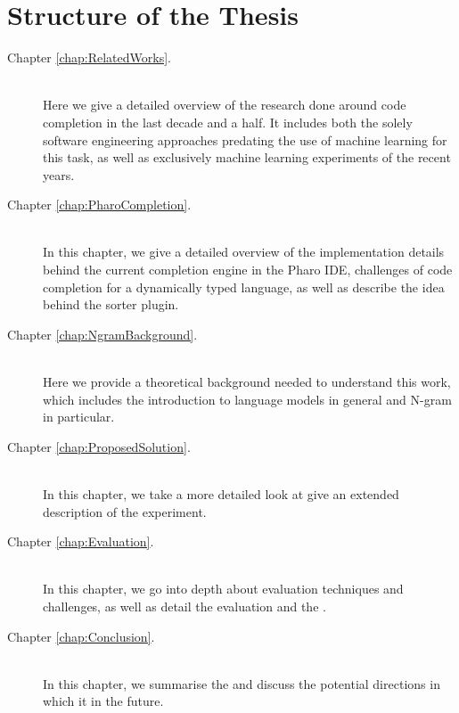 \section{Structure of the Thesis}
\label{sec:Introduction-Structure}
{\hypersetup{linkcolor=black}
\begin{description}
	\item [Chapter \ref{chap:RelatedWorks}. ] \hfill \\
	Here we give a detailed overview of the research done around code completion in the last decade and a half. It includes both the solely software engineering approaches predating the use of machine learning for this task, as well as exclusively machine learning experiments of the recent years.
    \item [Chapter \ref{chap:PharoCompletion}. ] \hfill \\
	In this chapter, we give a detailed overview of the implementation details behind the current completion engine in the Pharo IDE, challenges of code completion for a dynamically typed language, as well as describe the idea behind the sorter plugin.
	\item [Chapter \ref{chap:NgramBackground}. ] \hfill \\
    Here we provide a theoretical background needed to understand this work, which includes the introduction to  language models in general and N-gram  in particular.
    \item [Chapter \ref{chap:ProposedSolution}. ] \hfill \\
	In this chapter, we take a more detailed look at  give an extended description of the experiment.
	\item [Chapter \ref{chap:Evaluation}. ] \hfill \\
    In this chapter, we go into depth about evaluation techniques and challenges, as well as detail the evaluation   and the .
    \item [Chapter \ref{chap:Conclusion}. ] \hfill \\
	In this chapter, we summarise the  and discuss the potential directions in which it  in the future.
\end{description}
}
